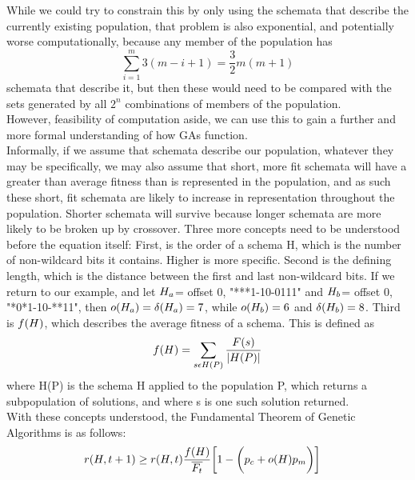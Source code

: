 While we could try to constrain this by only using the schemata that describe the currently existing population, that problem is also exponential, and potentially worse computationally, because any member of the population has $$\sum_{i=1}^{m}3(m-i+1) =\frac{3}{2}m(m+1)$$ schemata that describe it, but then these would need to be compared with the sets generated by all $2^n$ combinations of members of the population.\\
However, feasibility of computation aside, we can use this to gain a further and more formal understanding of how GAs function.\\
Informally, if we assume that schemata describe our population, whatever they may be specifically, we may also assume that short, more fit schemata will have a greater than average fitness than is represented in the population, and as such these short, fit schemata are likely to increase in representation throughout the population.  Shorter schemata will survive because longer schemata are more likely to be broken up by crossover. 
Three more concepts need to be understood before the equation itself: First,  is the order of a schema H, which is the number of non-wildcard bits it contains.  Higher is more specific.  Second is the defining length, which is the distance between the first and last non-wildcard bits.  If we return to our example, and let $H_a$= offset 0, "***1-10-0111" and $H_b$= offset 0, "*0*1-10-**11", then $o(H_a) = \delta(H_a)=7$, while $o(H_b) = 6$ and $\delta(H_b) = 8$.  Third is $f(H)$, which describes the average fitness of a schema.  This is defined as 
$$f(H)=\sum_{s\epsilon H(P)}^{}\frac{F(s)}{|H(P)|}$$ where H(P) is the schema H applied to the population P, which returns a subpopulation of solutions, and where s is one such solution returned.
   \\With these concepts understood, the Fundamental Theorem of Genetic Algorithms is as follows: \begin{align}
r(H, t+1)&\geq r(H, t) \frac{f(H)}{\overline{F_t}}\bigg[1-\bigg(p_c+o(H)p_m\bigg)\bigg]
\end{align}
